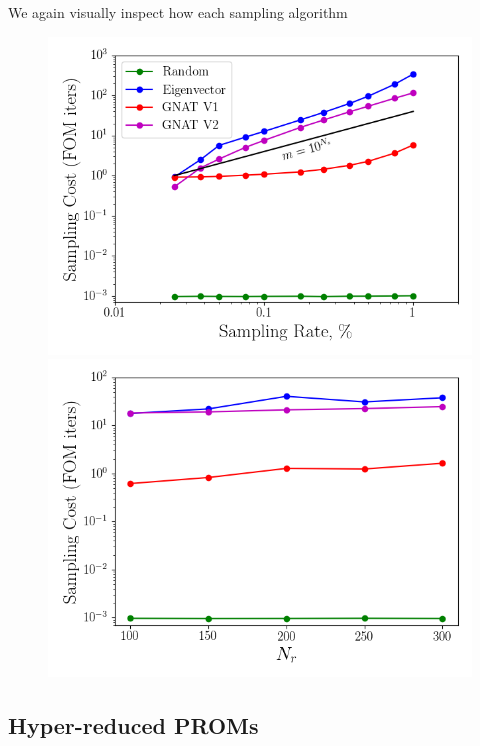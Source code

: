 We again visually inspect how each sampling algorithm

\begin{figure}
	\begin{minipage}{0.49\linewidth}
		\includegraphics[width=0.99\linewidth]{Chapters/CavityAndCVRC/Images/cvrc/deim/samp_timing_wrt_samprate.png}
	\end{minipage}
	\begin{minipage}{0.49\linewidth}
		\includegraphics[width=0.99\linewidth]{Chapters/CavityAndCVRC/Images/cvrc/deim/samp_timing_wrt_modes.png}
	\end{minipage}
\end{figure}

\subsection{Hyper-reduced PROMs}



